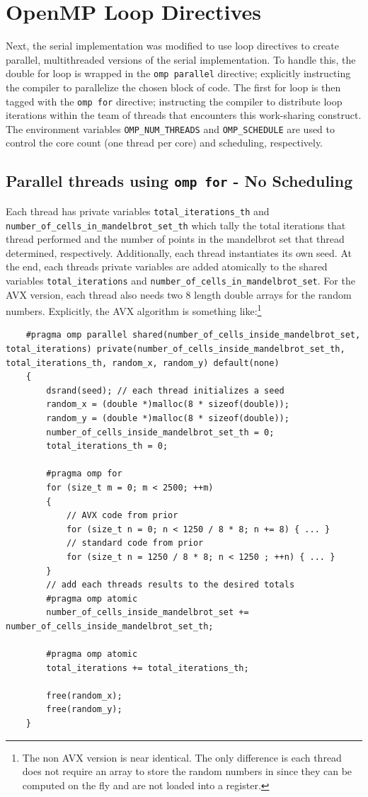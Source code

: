 \documentclass{article}
\begin{document}
\section{OpenMP Loop Directives}
Next, the serial implementation was modified to use loop directives to create parallel, 
multithreaded versions of the serial implementation. To handle this, the double 
for loop is wrapped in the \texttt{omp parallel} directive; explicitly instructing 
the compiler to parallelize the chosen block of code. The first for loop is then tagged 
with the \texttt{omp for} directive; instructing the compiler to distribute loop 
iterations within the team of threads that encounters this work-sharing construct. The environment variables 
\texttt{OMP\_NUM\_THREADS} and \texttt{OMP\_SCHEDULE} are used to control the core count (one thread per core) 
and scheduling, respectively.

\subsection{Parallel threads using \texttt{omp for} - No Scheduling}
Each thread has private variables \texttt{total\_iterations\_th} and \texttt{number\_of\_cells\_in\_mandelbrot\_set\_th} 
which tally the total iterations that thread performed and the number of points in the mandelbrot set that thread determined, respectively. Additionally, 
each thread instantiates its own seed.
At the end, each threads private variables are added atomically to the shared variables \texttt{total\_iterations} and \texttt{number\_of\_cells\_in\_mandelbrot\_set}. 
For the AVX version, each thread also needs two 8 length double arrays for the random numbers. Explicitly, the AVX algorithm is something like:\footnote{The non AVX version is 
near identical. The only difference is each thread does not require an array to store the random numbers in since they can be computed on the fly and are not loaded into a register.}
\begin{lstlisting}
    #pragma omp parallel shared(number_of_cells_inside_mandelbrot_set, total_iterations) private(number_of_cells_inside_mandelbrot_set_th, total_iterations_th, random_x, random_y) default(none)
    {
        dsrand(seed); // each thread initializes a seed
        random_x = (double *)malloc(8 * sizeof(double));
        random_y = (double *)malloc(8 * sizeof(double));
        number_of_cells_inside_mandelbrot_set_th = 0;
        total_iterations_th = 0;

        #pragma omp for
        for (size_t m = 0; m < 2500; ++m)
        {
            // AVX code from prior
            for (size_t n = 0; n < 1250 / 8 * 8; n += 8) { ... }
            // standard code from prior
            for (size_t n = 1250 / 8 * 8; n < 1250 ; ++n) { ... }
        }
        // add each threads results to the desired totals
        #pragma omp atomic
        number_of_cells_inside_mandelbrot_set += number_of_cells_inside_mandelbrot_set_th;

        #pragma omp atomic
        total_iterations += total_iterations_th;

        free(random_x);
        free(random_y);
    }
\end{lstlisting}
\end{document}

